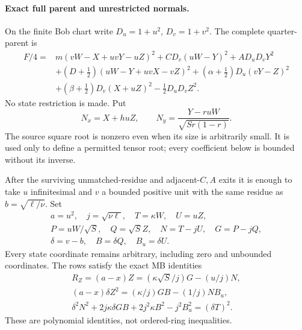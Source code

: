 \paragraph{Exact full parent and unrestricted normals.}
On the finite Bob chart write $D_u=1+u^2$, $D_v=1+v^2$.
The complete quarter-parent is
\[
\begin{split}
 F/4={}&m(vW-X+uvY-uZ)^2+C D_v(uW-Y)^2+A D_uD_vY^2\\
 &+(D+\tfrac12)(uW-Y+uvX-vZ)^2
 +(\alpha+\tfrac12)D_u(vY-Z)^2\\
 &+(\beta+\tfrac12)D_v(X+uZ)^2-\tfrac12D_uD_vZ^2.
\end{split}\tag{FM5}
\]
No state restriction is made. Put
\[
 N_x=X+huZ,\qquad N_y=\frac{Y-ruW}{\sqrt{Sr(1-r)}}.
 \tag{FM6}
\]
The source square root is nonzero even when its size is arbitrarily
small. It is used only to define a permitted tensor root; every
coefficient below is bounded without its inverse.

After the surviving unmatched-residue and adjacent-$C,A$ exits it is
enough to take $u$ infinitesimal and $v$ a bounded positive unit with
the same residue as $b=\sqrt{\ell/\nu}$. Set
\[
\begin{gathered}
 a=u^2,\quad j=\sqrt{\nu\ell},\quad T=\kappa W,\quad U=uZ,\\
 P=uW/\sqrt S,\quad Q=\sqrt S Z,\quad N=T-jU,\quad G=P-jQ,\\
 \delta=v-b,\quad B=\delta Q,\quad B_u=\delta U.
\end{gathered}
 \tag{FM7}
\]
Every state coordinate remains arbitrary, including zero and
unbounded coordinates. The rows satisfy the exact MB identities
\[
\begin{gathered}
 R_Z=(a-x)Z=(\kappa\sqrt S/j)G-(u/j)N,\\
 (a-x)\delta Z^2=(\kappa/j)GB-(1/j)NB_u,\\
 \delta^2N^2+2j\kappa\delta GB+2j^2\kappa B^2-j^2B_u^2
                  =(\delta T)^2.
\end{gathered}\tag{FM8}
\]
These are polynomial identities, not ordered-ring inequalities.

